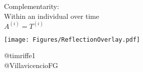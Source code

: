 \documentclass[20pt]{beamer}
\begin{document}
\begin{frame}[plain]
\Large
\begin{center}
Complementarity:\\ \vspace{1em}
Within an individual over time\\  \vspace{.5em} \huge
$A^{(i)} = T^{(i)}$
\end{center}
\end{frame}

\begin{frame}
\Large
\vspace{1em}
\begin{center}
\texttt{[image: Figures/ReflectionOverlay.pdf]}
\end{center}

\vspace{4em}
\begin{flushright}
@timriffe1 \\
@VillavicencioFG
\end{flushright}

\end{frame}

\end{document}
